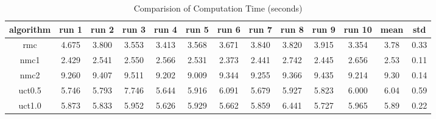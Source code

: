 \documentclass{article}
\begin{document}
\begin{table}[htbp!]
  \centering
  \caption{Comparision of Computation Time (seconds)}
    \begin{tabular}{ccccccccccccc}
    \toprule
    algorithm &  run 1 & run 2 & run 3 & run 4 & run 5 & run 6 & run 7 & run 8 & run 9 & run 10 & mean & std\\
    \midrule
    rmc & 4.675 & 3.800 & 3.553 & 3.413 & 3.568 & 3.671 & 3.840 & 3.820 & 3.915 & 3.354 & 3.78 & 0.33 \\
    nmc1 & 2.429 & 2.541 & 2.550 & 2.566 & 2.531 & 2.373 & 2.441 & 2.742 & 2.445 & 2.656 & 2.53 & 0.11 \\
    nmc2 & 9.260 & 9.407 & 9.511 & 9.202 & 9.009 & 9.344 & 9.255 & 9.366 & 9.435 & 9.214 & 9.30 & 0.14 \\
    uct0.5 & 5.746 & 5.793 & 7.746 & 5.644 & 5.916 & 6.091 & 5.679 & 5.927 & 5.823 & 6.000 & 6.04 & 0.59 \\
    uct1.0 & 5.873 & 5.833 & 5.952 & 5.626 & 5.929 & 5.662 & 5.859 & 6.441 & 5.727 & 5.965 & 5.89 & 0.22 \\
    \bottomrule
    \end{tabular}%
  \label{tab:computation_time_compare}%
\end{table}%
\end{document}
